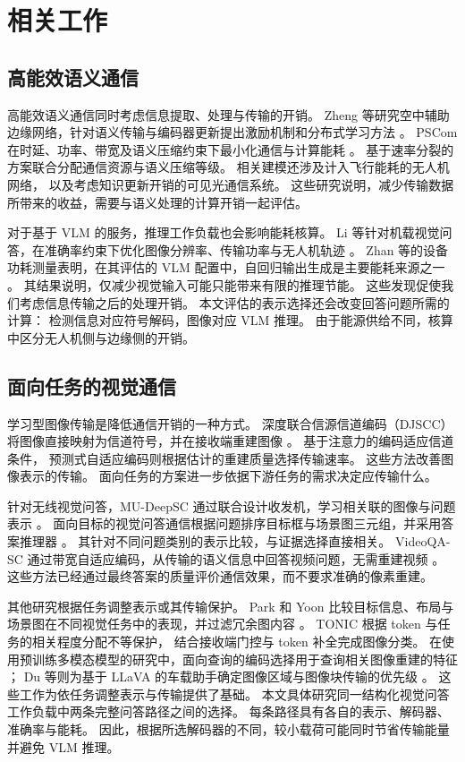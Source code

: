 \section{相关工作}\label{sec:related}

\subsection{高能效语义通信}
高能效语义通信同时考虑信息提取、处理与传输的开销。
Zheng 等研究空中辅助边缘网络，针对语义传输与编码器更新提出激励机制和分布式学习方法
\cite{zheng2024aerialee}。
PSCom 在时延、功率、带宽及语义压缩约束下最小化通信与计算能耗
\cite{dai2025pscom}。
基于速率分裂的方案联合分配通信资源与语义压缩等级\cite{xu2025rsmagreen}。
相关建模还涉及计入飞行能耗的无人机网络\cite{wang2026rsma}，
以及考虑知识更新开销的可见光通信系统\cite{zhao2026vlc}。
这些研究说明，减少传输数据所带来的收益，需要与语义处理的计算开销一起评估。

对于基于 VLM 的服务，推理工作负载也会影响能耗核算。
Li 等针对机载视觉问答，在准确率约束下优化图像分辨率、传输功率与无人机轨迹
\cite{li2026onboard}。
Zhan 等的设备功耗测量表明，在其评估的 VLM 配置中，自回归输出生成是主要能耗来源之一
\cite{zhan2026seeing}。
其结果说明，仅减少视觉输入可能只能带来有限的推理节能。
这些发现促使我们考虑信息传输之后的处理开销。
本文评估的表示选择还会改变回答问题所需的计算：
检测信息对应符号解码，图像对应 VLM 推理。
由于能源供给不同，核算中区分无人机侧与边缘侧的开销。

\subsection{面向任务的视觉通信}
学习型图像传输是降低通信开销的一种方式。
深度联合信源信道编码（DJSCC）将图像直接映射为信道符号，并在接收端重建图像
\cite{bourtsoulatze2019djscc}。
基于注意力的编码适应信道条件\cite{yang2023adjscc}，
预测式自适应编码则根据估计的重建质量选择传输速率\cite{zhang2023padc}。
这些方法改善图像表示的传输。
面向任务的方案进一步依据下游任务的需求决定应传输什么。

针对无线视觉问答，MU-DeepSC 通过联合设计收发机，学习相关联的图像与问题表示
\cite{xie2022mudeepscwcl,xie2021mudeepsc}。
面向目标的视觉问答通信根据问题排序目标框与场景图三元组，并采用答案推理器
\cite{liu2024gosg}。
其针对不同问题类别的表示比较，与证据选择直接相关。
VideoQA-SC 通过带宽自适应编码，从传输的语义信息中回答视频问题，无需重建视频
\cite{guo2025videoqasc}。
这些方法已经通过最终答案的质量评价通信效果，而不要求准确的像素重建。

其他研究根据任务调整表示或其传输保护。
Park 和 Yoon 比较目标信息、布局与场景图在不同视觉任务中的表现，并过滤冗余图内容
\cite{park2025transmit}。
TONIC 根据 token 与任务的相关程度分配不等保护，
结合接收端门控与 token 补全完成图像分类\cite{liu2026tonic}。
在使用预训练多模态模型的研究中，面向查询的编码选择用于查询相关图像重建的特征
\cite{huang2026query}；
Du 等则为基于 LLaVA 的车载助手确定图像区域与图像块传输的优先级
\cite{jiang2025lmmvn}。
这些工作为依任务调整表示与传输提供了基础。
本文具体研究同一结构化视觉问答工作负载中两条完整问答路径之间的选择。
每条路径具有各自的表示、解码器、准确率与能耗。
因此，根据所选解码器的不同，较小载荷可能同时节省传输能量并避免 VLM 推理。

